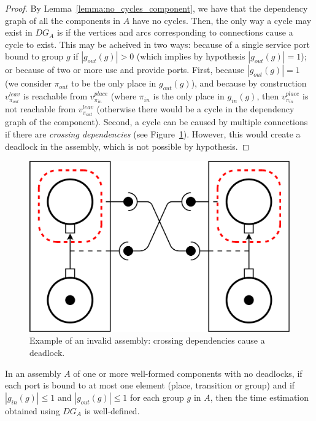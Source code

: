 \begin{proof}
 By Lemma~\ref{lemma:no_cycles_component}, we have that the dependency graph
 of all the components in $A$ have no cycles.
 Then, the only way a cycle may exist in $DG_A$ is if the vertices and arcs
 corresponding to connections cause a cycle to exist.
 This may be acheived in two ways: because of a single service port bound to
 group $g$ if $\left|g_{out}(g)\right|>0$ (which implies by hypothesis
 $\left|g_{out}(g)\right|=1$); or because of two or more use and provide ports.
 First, because $\left|g_{out}(g)\right|=1$ (we consider $\pi_{out}$ to be the only
 place in $g_{out}(g)$), and because by construction $v_{\pi_{out}}^{leav}$ is
 reachable from $v_{\pi_{in}}^{place}$ (where $\pi_{in}$ is the only place in $g_{in}(g)$,
 then $v_{\pi_{in}}^{place}$ is not reachable from $v_{\pi_{out}}^{leav}$ (otherwise
 there would be a cycle in the dependency graph of the component). Second, a
 cycle can be caused by multiple connections if there are \emph{crossing
 dependencies} (see Figure~\ref{fig:deadlock}). However, this would create a
 deadlock in the assembly, which is not possible by hypothesis.
\end{proof}

\begin{figure}[t]
  \begin{center}
    \includegraphics[width=0.5\linewidth]{./images/deadlock.pdf}
  \end{center}
  \caption{Example of an invalid assembly: crossing dependencies cause a deadlock.}
  \label{fig:deadlock}
\end{figure}

\begin{theorem}
 In an assembly $A$ of one or more well-formed components with no deadlocks,
 if each port is bound to at most one element (place, transition or group) and if
 $\left|g_{in}(g)\right|\leq 1$ and $\left|g_{out}(g)\right|\leq 1$ for each group
 $g$ in $A$, then the time estimation obtained using $DG_A$ is well-defined.
 \label{theorem:well_defined}
\end{theorem}

